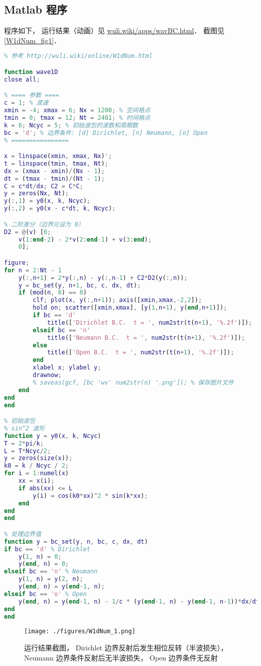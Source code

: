 \subsection{Matlab 程序}
程序如下， 运行结果（动画）见 \href{http://wuli.wiki/apps/wavBC.html}{wuli.wiki/apps/wavBC.html}． 截图见\autoref{W1dNum_fig1}．

\begin{lstlisting}[language=matlab, caption=wave1D.m]
% 一维波动方程数值解
% 参考 http://wuli.wiki/online/W1dNum.html

function wave1D
close all;

% ==== 参数 ====
c = 1; % 波速
xmin = -4; xmax = 6; Nx = 1200; % 空间格点
tmin = 0; tmax = 12; Nt = 2401; % 时间格点
k = 6; Ncyc = 5; % 初始波包的波数和周期数
bc = 'd'; % 边界条件: [d] Dirichlet, [n] Neumann, [o] Open
% ================

x = linspace(xmin, xmax, Nx)';
t = linspace(tmin, tmax, Nt);
dx = (xmax - xmin)/(Nx - 1);
dt = (tmax - tmin)/(Nt - 1);
C = c*dt/dx; C2 = C*C;
y = zeros(Nx, Nt);
y(:,1) = y0(x, k, Ncyc);
y(:,2) = y0(x - c*dt, k, Ncyc);

% 二阶差分（边界元设为 0）
D2 = @(v) [0;
    v(1:end-2) - 2*v(2:end-1) + v(3:end);
    0];

figure;
for n = 2:Nt - 1
    y(:,n+1) = 2*y(:,n) - y(:,n-1) + C2*D2(y(:,n));
    y = bc_set(y, n+1, bc, c, dx, dt);
    if (mod(n, 8) == 0)
        clf; plot(x, y(:,n+1)); axis([xmin,xmax,-2,2]);
        hold on; scatter([xmin,xmax], [y(1,n+1), y(end,n+1)]);
        if bc == 'd'
            title(['Dirichlet B.C.  t = ', num2str(t(n+1), '%.2f')]);
        elseif bc == 'n'
            title(['Neumann B.C.  t = ', num2str(t(n+1), '%.2f')]);
        else
            title(['Open B.C.  t = ', num2str(t(n+1), '%.2f')]);
        end
        xlabel x; ylabel y;
        drawnow;
        % saveas(gcf, [bc 'wv' num2str(n) '.png']); % 保存图片文件
    end
end
end

% 初始波包
% sin^2 波形
function y = y0(x, k, Ncyc)
T = 2*pi/k;
L = T*Ncyc/2;
y = zeros(size(x));
k0 = k / Ncyc / 2;
for i = 1:numel(x)
    xx = x(i);
    if abs(xx) <= L
        y(i) = cos(k0*xx)^2 * sin(k*xx);
    end
end
end

% 处理边界值
function y = bc_set(y, n, bc, c, dx, dt)
if bc == 'd' % Dirichlet
    y(1, n) = 0;
    y(end, n) = 0;
elseif bc == 'n' % Neumann
    y(1, n) = y(2, n);
    y(end, n) = y(end-1, n);
elseif bc == 'o' % Open
    y(end, n) = y(end-1, n) - 1/c * (y(end-1, n) - y(end-1, n-1))*dx/dt;
end
end
\end{lstlisting}

\begin{figure}[ht]
\centering
\texttt{[image: ./figures/W1dNum\_1.png]}
\caption{运行结果截图， Dirichlet 边界反射后发生相位反转（半波损失）， Neumann 边界条件反射后无半波损失， Open 边界条件无反射} \label{W1dNum_fig1}
\end{figure}

